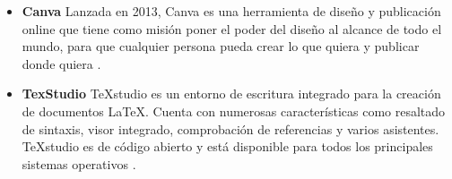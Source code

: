 \begin{itemize}
	
	
	\item\textbf{Canva}	Lanzada en 2013, Canva es una herramienta de diseño y publicación online que tiene como misión poner el poder del diseño al alcance de todo el mundo, para que cualquier persona pueda crear lo que quiera y publicar donde quiera \cite{canva2025about}.
	
	
	
	\item\textbf{TexStudio}	TeXstudio es un entorno de escritura integrado para la creación de documentos LaTeX. Cuenta con numerosas características como resaltado de sintaxis, visor integrado, comprobación de referencias y varios asistentes. TeXstudio es de código abierto y está disponible para todos los principales sistemas operativos \cite{texstudio}.
	
	
	
\end{itemize}

